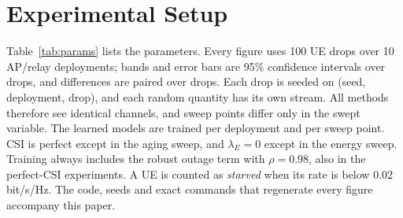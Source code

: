 \documentclass[conference]{IEEEtran}
\begin{document}
\section{Experimental Setup}
Table~\ref{tab:params} lists the parameters. Every figure uses 100 UE drops
over 10 AP/relay deployments; bands and error bars are 95\% confidence
intervals over drops, and differences are paired over drops. Each drop is
seeded on (seed, deployment, drop), and each random quantity has its own
stream. All methods therefore see identical channels, and sweep points differ
only in the swept variable. The learned models are trained per deployment and
per sweep point. CSI is perfect except in the aging sweep, and $\lambda_E=0$
except in the energy sweep. Training always includes the robust outage term
with $\rho=0.98$, also in the perfect-CSI experiments. A UE is counted as
\emph{starved} when its rate is below 0.02\,bit/s/Hz. The code, seeds and
exact commands that regenerate every figure accompany this paper.
\end{document}
